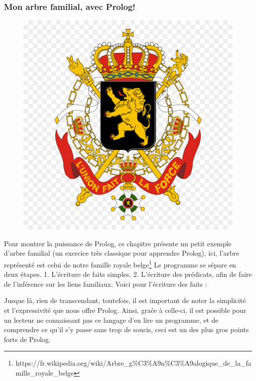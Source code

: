 \documentclass[a4paper, 12pt]{article}
\numberwithin{equation}{subsection}
\begin{document}
\subsubsection{Mon arbre familial, avec Prolog!}
\begin{figure}[H]
  \centering
  \includegraphics[scale=0.15]{imgs/blason.jpg}
\end{figure}

Pour montrer la puissance de Prolog, ce chapitre présente un petit exemple d'arbre familial (un exercice très classique pour apprendre Prolog), ici, l'arbre représenté est celui de notre famille royale belge\footnote{https://fr.wikipedia.org/wiki/Arbre\_g\%C3\%A9n\%C3\%A9alogique\_de\_la\_famille\_royale\_belge}
Le programme se sépare en deux étapes.
1. L'écriture de faits simples.
2. L'écriture des prédicats, afin de faire de l'inférence sur les liens familiaux.
Voici pour l'écriture des faits :

Jusque là, rien de transcendant, toutefois, il est important de noter la simplicité et l'expressivité que nous offre Prolog. Ainsi, graĉe à celle-ci, il est possible pour un lecteur ne connaissant pas ce langage d'en lire un programme, et de comprendre ce qu'il s'y passe sans trop de soucis, ceci est un des plus gros points forts de Prolog. \\
\end{document}
